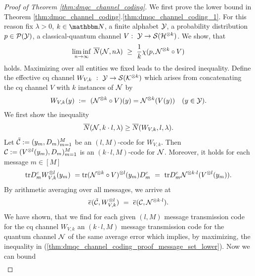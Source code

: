      \begin{proof}[Proof of Theorem \ref{thm:dmqc_channel_coding}]
      We first prove the lower bound in Theorem \ref{thm:dmqc_channel_coding}.\ref{thm:dmqc_channel_coding_1}. For this reason fix $\lambda > 0$, $k \in \bbmN$, a finite alphabet ${\mathcal Y}$, a probability distribution $p \in {\mathcal P}({\mathcal Y})$, a classical-quantum channel $V: \ {\mathcal Y} \rightarrow {\mathcal S}({\mathcal H}^{\otimes k})$. 
      We show, that 
      \begin{align*}
       \underset{n \rightarrow \infty}{\liminf} \ \overline{N}({\mathcal N}, n \lambda) \ \geq \ \frac{1}{k} \chi(p, {\mathcal N}^{\otimes k} \circ V)
      \end{align*}
      holds. Maximizing over all entities we fixed leads to the desired inequality. Define the effective cq channel $W_{V,k} \ : \ {\mathcal Y} \rightarrow {\mathcal S}({\mathcal K}^{\otimes k})$ which arises from concatenating the cq channel $V$ with $k$ instances of ${\mathcal N}$ by
      \begin{align*}
        W_{V,k}(y) \ :=  \ ({\mathcal N}^{\otimes k} \circ V)(y) = {\mathcal N}^{\otimes k}(V(y)) &&(y \in {\mathcal Y}).
      \end{align*}
      We first show the inequality
      \begin{align}
       \overline{N}( {\mathcal N} , k\cdot l , \lambda )  \geq \overline{N}(W_{V,k} ,l, \lambda).  \label{thm:dmqc_channel_coding_proof_message_set_lower}
      \end{align}
      Let $\tilde{{\mathcal C}} := (y_m, D_m)_{m=1}^M$ be an $(l,M)$-code for $W_{V,k}$. Then ${\mathcal C} := (V^{\otimes l}(y_m), D_m)_{m=1}^M$ is an $(k \cdot l, M)$-code for ${\mathcal N}$. Moreover, it holds for each message $m \in [M]$
      \begin{align*}
       \mathrm{tr} D_m^c W_{V,k}^{\otimes l}(y_m)  \ = \mathrm{tr}({\mathcal N}^{\otimes k} \circ V)^{\otimes l}(y_m)D_m^c \ = \ \mathrm{tr} D_m^c {\mathcal N}^{\otimes k \cdot l}(V^{\otimes l}(y_m)).
      \end{align*}
      By arithmetic averaging over all messages, we arrive at
      \begin{align*}
       \overline{e}(\tilde{\cC}, W_{V,k}^{\otimes l}) \ = \ \overline{e}(\cC, \cN^{\otimes k \cdot l}).
      \end{align*}
      We have shown, that we find for each given $(l,M)$ message transmission code for the cq channel $W_{V,k}$ an $(k\cdot l, M)$ message transmission code for the quantum channel ${\mathcal N}$ of the same average error which implies, by maximizing, 
      the inequality in (\ref{thm:dmqc_channel_coding_proof_message_set_lower}). Now we can bound
      \begin{align*}

\end{align*}
\end{proof}
